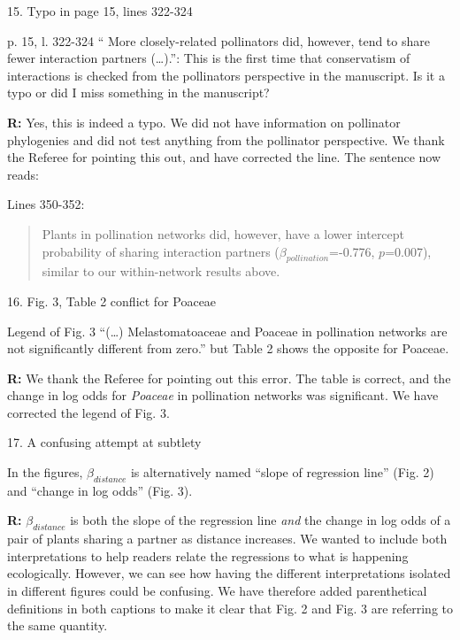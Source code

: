 \documentclass[12pt]{letter}
\newenvironment{refquote}{\bigskip \begin{it}}{\end{it}\smallskip}
\begin{document}
	15. Typo in page 15, lines 322-324


		\begin{refquote}
			p. 15, l. 322-324 “ More closely-related pollinators did, however, tend to share fewer interaction partners (…).”: This is the first time that conservatism of interactions is checked from the pollinators perspective in the manuscript. Is it a typo or did I miss something in the manuscript?
		\end{refquote}


		\textbf{R:} Yes, this is indeed a typo. We did not have information on pollinator phylogenies and did not test anything from the pollinator perspective. We thank the Referee for pointing this out, and have corrected the line. The sentence now reads:


		Lines 350-352:
		

		\begin{quotation}
			Plants in pollination networks did, however, have a lower intercept probability of sharing interaction partners ($\beta_{pollination}$=-0.776, $p$=0.007), similar to our within-network results above.
		\end{quotation}


	16. Fig. 3, Table 2 conflict for Poaceae


		\begin{refquote}
			Legend of Fig. 3 “(…) Melastomatoaceae and Poaceae in pollination networks are not significantly different from zero.” but Table 2 shows the opposite for Poaceae.
		\end{refquote}


		\textbf{R:} We thank the Referee for pointing out this error. The table is correct, and the change in log odds for \emph{Poaceae} in pollination networks was significant. We have corrected the legend of Fig. 3.


	17. A confusing attempt at subtlety

		\begin{refquote}
			In the figures, $\beta_{distance}$ is alternatively named “slope of regression line” (Fig. 2) and “change in log odds” (Fig. 3).
		\end{refquote}


		\textbf{R:} $\beta_{distance}$ is both the slope of the regression line \emph{and} the change in log odds of a pair of plants sharing a partner as distance increases. We wanted to include both interpretations to help readers relate the regressions to what is happening ecologically. However, we can see how having the different interpretations isolated in different figures could be confusing. We have therefore added parenthetical definitions in both captions to make it clear that Fig. 2 and Fig. 3 are referring to the same quantity.
\end{document}
